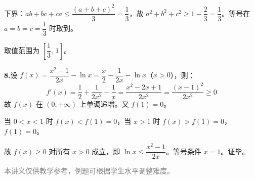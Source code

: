 \documentclass[12pt, a4paper]{ctexart}
\begin{document}
\begin{knowledgebox}[参考答案]
下界：$ab+bc+ca \leqslant \dfrac{(a+b+c)^2}{3} = \dfrac{1}{3}$，故 $a^2+b^2+c^2 \geqslant 1-\dfrac{2}{3} = \dfrac{1}{3}$。等号在 $a=b=c=\dfrac{1}{3}$ 时取到。

取值范围为 $\left[\dfrac{1}{3},\, 1\right]$。

\medskip
\textbf{8.}\quad 设 $f(x) = \dfrac{x^2-1}{2x}-\ln x = \dfrac{x}{2}-\dfrac{1}{2x}-\ln x$（$x>0$），则：
\[
f'(x) = \frac{1}{2}+\frac{1}{2x^2}-\frac{1}{x} = \frac{x^2-2x+1}{2x^2} = \frac{(x-1)^2}{2x^2} \geqslant 0
\]
故 $f(x)$ 在 $(0,+\infty)$ 上单调递增。又 $f(1) = 0$。

当 $0<x<1$ 时 $f(x) < f(1) = 0$，当 $x>1$ 时 $f(x) > f(1) = 0$，$f(1) = 0$。

故 $f(x) \geqslant 0$ 对所有 $x>0$ 成立，即 $\ln x \leqslant \dfrac{x^2-1}{2x}$。等号条件 $x=1$。证毕。
\end{knowledgebox}

\vfill
\begin{center}
\small\textcolor{gray}{本讲义仅供教学参考，例题可根据学生水平调整难度。}
\end{center}
\end{document}
